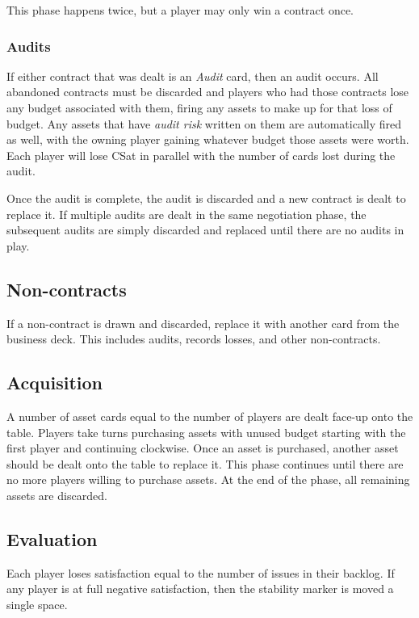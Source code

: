 \documentclass[twocolumn]{article}
\begin{document}
This phase happens twice, but a player may only win a contract once.

\subsubsection*{Audits}

If either contract that was dealt is an \emph{Audit} card, then an audit occurs. All abandoned contracts must be discarded and players who had those contracts lose any budget associated with them, firing any assets to make up for that loss of budget. Any assets that have \emph{audit risk} written on them are automatically fired as well, with the owning player gaining whatever budget those assets were worth. Each player will lose CSat in parallel with the number of cards lost during the audit.

Once the audit is complete, the audit is discarded and a new contract is dealt to replace it. If multiple audits are dealt in the same negotiation phase, the subsequent audits are simply discarded and replaced until there are no audits in play.

\subsection*{Non-contracts}

If a non-contract is drawn and discarded, replace it with another card from the business deck. This includes audits, records losses, and other non-contracts.

\pagebreak

\subsection*{Acquisition}

A number of asset cards equal to the number of players are dealt face-up onto the table. Players take turns purchasing assets with unused budget starting with the first player and continuing clockwise. Once an asset is purchased, another asset should be dealt onto the table to replace it. This phase continues until there are no more players willing to purchase assets. At the end of the phase, all remaining assets are discarded.

\subsection*{Evaluation}

Each player loses satisfaction equal to the number of issues in their backlog. If any player is at full negative satisfaction, then the stability marker is moved a single space.
\end{document}
